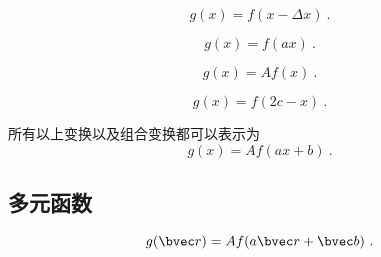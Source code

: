 

\begin{issues}
\issueDraft
\end{issues}

\begin{equation}
g(x) = f(x - \Delta x)~.
\end{equation}

\begin{equation}
g(x) = f(ax)~.
\end{equation}

\begin{equation}
g(x) = A f(x)~.
\end{equation}

\begin{equation}
g(x) = f(2c - x)~.
\end{equation}

所有以上变换以及组合变换都可以表示为
\begin{equation}
g(x) = Af(ax + b)~.
\end{equation}




\subsection{多元函数}
\begin{equation}
g(\bvec r) = Af(a\bvec r + \bvec b)~.
\end{equation}
